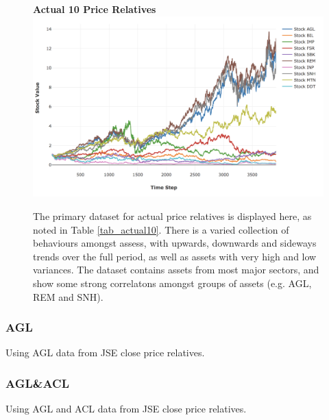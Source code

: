 \documentclass[a4paper,11pt,oneside]{article}
\theoremstyle{plain}
\theoremstyle{definition}
\begin{document}
	
	\begin{figure}[H]
		\centering
		\textbf{Actual 10 Price Relatives}
		\includegraphics[scale=0.45]{images/results/prices/actual10_prices.png} 
		\caption[Actual 10 Price Relatives]{The primary dataset for actual price relatives is displayed here, as noted in Table \ref{tab_actual10}. There is a varied collection of behaviours amongst assess, with upwards, downwards and sideways trends over the full period, as well as assets with very high and low variances. The dataset contains assets from most major sectors, and show some strong correlatons amongst groups of assets (e.g. AGL, REM and SNH). }
		\label{figure-actual10_prices}
	\end{figure}
	
	\subsubsection{AGL}\label{dataset_agl}
	
	Using AGL data from JSE close price relatives.
	
	\subsubsection{AGL\&ACL}\label{dataset_aglacl}
	
	Using AGL and ACL data from JSE close price relatives.
	
\end{document}

